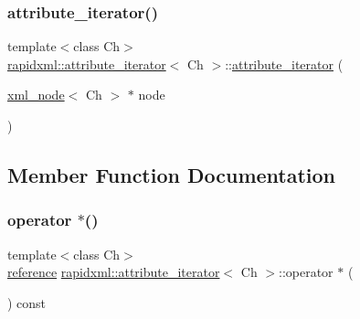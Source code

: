 \subsubsection{\texorpdfstring{attribute\_iterator()}{attribute\_iterator()}\hspace{0.1cm}{\footnotesize\ttfamily [2/2]}}
{\footnotesize\ttfamily template$<$class Ch$>$ \\
\mbox{\hyperlink{classrapidxml_1_1attribute__iterator}{rapidxml\+::attribute\+\_\+iterator}}$<$ Ch $>$\+::\mbox{\hyperlink{classrapidxml_1_1attribute__iterator}{attribute\+\_\+iterator}} (\begin{DoxyParamCaption}\item[{\mbox{\hyperlink{classrapidxml_1_1xml__node}{xml\+\_\+node}}$<$ Ch $>$ $\ast$}]{node }\end{DoxyParamCaption})\hspace{0.3cm}{\ttfamily [inline]}}



\subsection{Member Function Documentation}
\mbox{\label{classrapidxml_1_1attribute__iterator_af26af25174fee4503d3854162ef125b9}} 
\subsubsection{\texorpdfstring{operator $\ast$()}{operator *()}}
{\footnotesize\ttfamily template$<$class Ch$>$ \\
\mbox{\hyperlink{classrapidxml_1_1attribute__iterator_a097343e44557de14de86b470d3f917d9}{reference}} \mbox{\hyperlink{classrapidxml_1_1attribute__iterator}{rapidxml\+::attribute\+\_\+iterator}}$<$ Ch $>$\+::operator $\ast$ (\begin{DoxyParamCaption}{ }\end{DoxyParamCaption}) const\hspace{0.3cm}{\ttfamily [inline]}}

\mbox{\label{classrapidxml_1_1attribute__iterator_a39e8cf336c324521fd9c720abf280d88}} 
